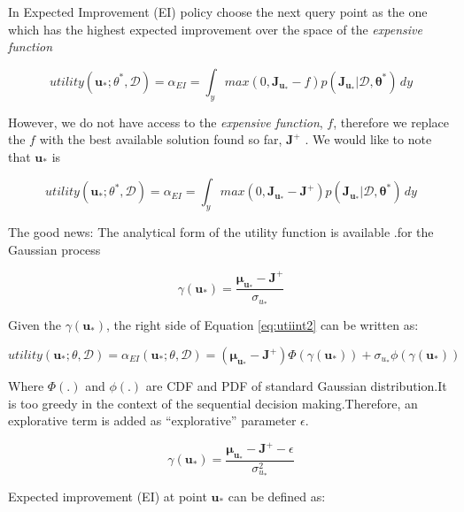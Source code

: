 \documentclass[]{elsarticle} %
\begin{document}
In Expected Improvement (EI) policy choose the next query point as the one which has the highest expected improvement over the space of the \emph{expensive function}

\begin{equation}
utility(\mathbf{u_\ast};\theta^{\ast},\mathcal{D})=\alpha_{EI}=\int_{y}^{}max(0,\mathbf{J_{u_*}}-f)p(\mathbf{J_{u_*}}|\mathbf{\mathcal{D},\theta^\ast}) \,dy
\label{eq:utiint}
\end{equation}

However, we do not have access to the \emph{expensive function}, \(f\), therefore we replace the \(f\) with the best available solution found so far, \(\mathbf{J}^+\) . We would like to note that \(\mathbf{u}_*\) is

\begin{equation}
utility(\mathbf{u_\ast};\theta^\ast,\mathcal{D})=\alpha_{EI}=\int_{y}^{}max(0,\mathbf{J_{u_*}}-\mathbf{J^+})p(\mathbf{J_{u_*}}|\mathbf{\mathcal{D},\theta^\ast}) \,dy
\label{eq:utiint2}
\end{equation}

The good news: The analytical form of the utility function is available .for the Gaussian process

\begin{equation}
\gamma(\mathbf{u_*})=\frac{\mathbf{\mu_{u_\ast}}-\mathbf{J^+}}{\sigma_{u_{\ast}}}
\label{eq:gamma}
\end{equation}

Given the \(\gamma(\mathbf{u_*})\), the right side of Equation \eqref{eq:utiint2} can be written as:

\begin{equation}
utility(\mathbf{u_*};\theta,\mathcal{D})=\alpha_{EI}(\mathbf{u_*};\theta,\mathcal{D})=(\mathbf{\mu_{u_\ast}}-\mathbf{J^+})\Phi(\gamma(\mathbf{u
_*})) + \sigma_{u_{\ast}} \phi(\gamma(\mathbf{u_*}))
\label{eq:utility}
\end{equation}

Where \(\Phi(.)\) and \(\phi(.)\) are CDF and PDF of standard Gaussian distribution.It is too greedy in the context of the sequential decision making.Therefore, an explorative term is added as ``explorative'' parameter \(\epsilon\).

\begin{equation}
\gamma(\mathbf{u_*})=\frac{\mathbf{\mu_{u_\ast}}-\mathbf{J^+}-\epsilon}{\sigma^2_{u_{\ast}}}
\label{eq:gamma_no_greed}
\end{equation}

Expected improvement (EI) at point \(\mathbf{u_*}\) can be defined as:
\end{document}
